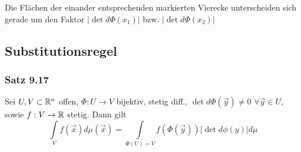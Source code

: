 \begin{center}
\end{center}

Die Flächen der einander entsprechenden markierten Vierecke unterscheiden sich gerade um den Faktor $\left|\det d\Phi\left( x_1\right)\right|$ bzw. $\left|\det d\Phi\left( x_2\right)\right|$
\subsection*{Substitutionsregel}
\subsubsection*{Satz 9.17}
Sei $U,V\subset\mathbb{R}^n$ offen, $\Phi:U\to V$ bijektiv, stetig diff., $\det d\Phi\left( \vec y\right)\not=0$ $\forall\vec y\in U$, sowie $f: V\to\mathbb{R}$ stetig. Dann gilt
\[\int\limits_V {f\left( {\vec x} \right)d\mu \left( {\vec x} \right)}  = \int\limits_{\Phi \left( U \right) = V} {f\left( {\Phi \left( {\vec y} \right)} \right)\left| {\det d\phi \left( y \right)} \right|} d\mu \]

